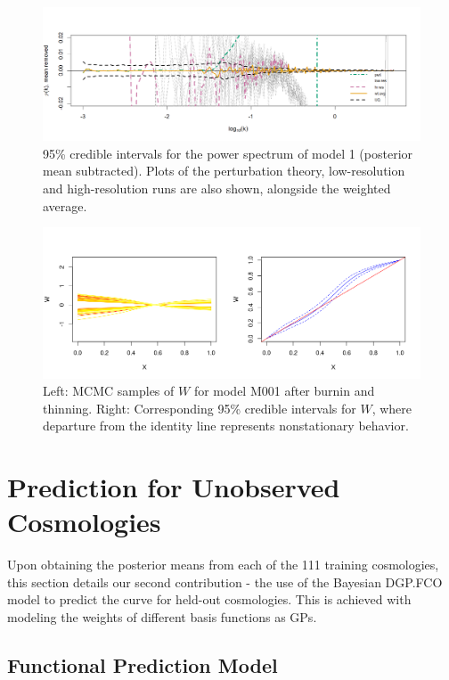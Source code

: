 \documentclass[11pt]{article}
\begin{document}
\begin{figure}[ht]
    \centering
    \includegraphics[width=6in]{plot_fit.png}
    \caption{95\% credible intervals for the power spectrum of model 1 (posterior mean 
             subtracted). Plots of the perturbation theory, low-resolution and high-resolution 
             runs are also shown, alongside the weighted average.}
    \label{fig:plot_fit}
\end{figure}

\begin{figure}[ht]
   \centering
   \includegraphics[width=6in]{plot_warp_M001.png}
   \caption{Left: MCMC samples of $W$ for model M001 after burnin and thinning. 
            Right: Corresponding 95\% credible intervals for $W$, where departure 
            from the identity line represents nonstationary behavior.}
   \label{fig:plot_warp}
\end{figure}

\section{Prediction for Unobserved Cosmologies}
\label{sec:pred}

Upon obtaining the posterior means from each of the 111 training cosmologies, this 
section details our second contribution - the use of the Bayesian DGP.FCO model 
to predict the curve for held-out cosmologies. This is achieved with modeling the 
weights of different basis functions as GPs.

\subsection{Functional Prediction Model}
\label{subsec:pca}
\end{document}
